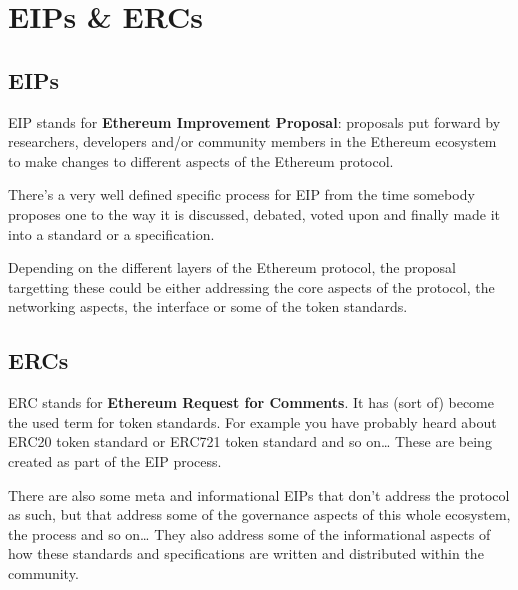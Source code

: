 \section{EIPs \& ERCs}\label{eips-ercs}

\subsection{EIPs}\label{eips}

EIP stands for \textbf{Ethereum Improvement Proposal}: proposals put
forward by researchers, developers and/or community members in the
Ethereum ecosystem to make changes to different aspects of the Ethereum
protocol.

There's a very well defined specific process for EIP from the time
somebody proposes one to the way it is discussed, debated, voted upon
and finally made it into a standard or a specification.

Depending on the different layers of the Ethereum protocol, the proposal
targetting these could be either addressing the core aspects of the
protocol, the networking aspects, the interface or some of the token
standards.

\subsection{ERCs}\label{ercs}

ERC stands for \textbf{Ethereum Request for Comments}. It has (sort of)
become the used term for token standards. For example you have probably
heard about ERC20 token standard or ERC721 token standard and so
on\ldots{} These are being created as part of the EIP process.

There are also some meta and informational EIPs that don't address the
protocol as such, but that address some of the governance aspects of
this whole ecosystem, the process and so on\ldots{} They also address
some of the informational aspects of how these standards and
specifications are written and distributed within the community.

